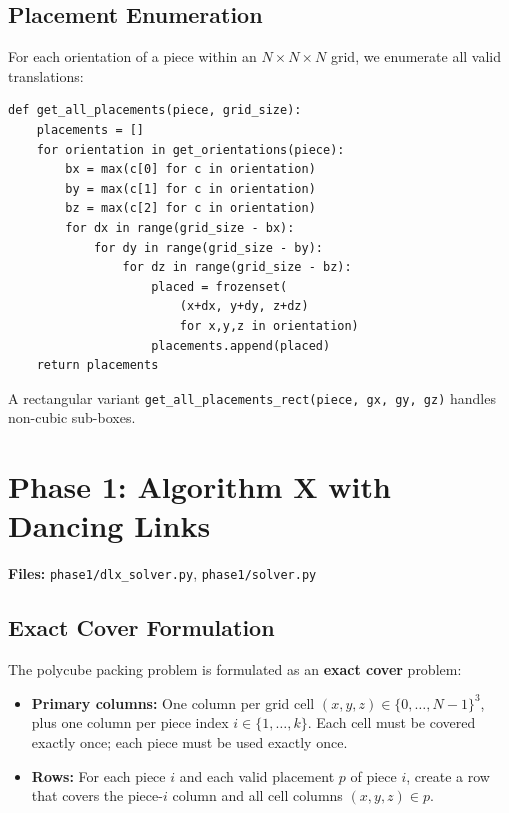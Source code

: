 \documentclass[11pt]{article}
\begin{document}
\subsection{Placement Enumeration}

For each orientation of a piece within an $N \times N \times N$ grid, we enumerate all valid translations:

\begin{lstlisting}
def get_all_placements(piece, grid_size):
    placements = []
    for orientation in get_orientations(piece):
        bx = max(c[0] for c in orientation)
        by = max(c[1] for c in orientation)
        bz = max(c[2] for c in orientation)
        for dx in range(grid_size - bx):
            for dy in range(grid_size - by):
                for dz in range(grid_size - bz):
                    placed = frozenset(
                        (x+dx, y+dy, z+dz)
                        for x,y,z in orientation)
                    placements.append(placed)
    return placements
\end{lstlisting}

A rectangular variant \texttt{get\_all\_placements\_rect(piece, gx, gy, gz)} handles non-cubic sub-boxes.

\section{Phase 1: Algorithm X with Dancing Links}

\textbf{Files:} \texttt{phase1/dlx\_solver.py}, \texttt{phase1/solver.py}

\subsection{Exact Cover Formulation}

The polycube packing problem is formulated as an \textbf{exact cover} problem:

\begin{itemize}[nosep]
  \item \textbf{Primary columns:} One column per grid cell $(x, y, z) \in \{0, \ldots, N{-}1\}^3$, plus one column per piece index $i \in \{1, \ldots, k\}$. Each cell must be covered exactly once; each piece must be used exactly once.
  \item \textbf{Rows:} For each piece $i$ and each valid placement $p$ of piece $i$, create a row that covers the piece-$i$ column and all cell columns $(x, y, z) \in p$.
\end{itemize}
\end{document}
